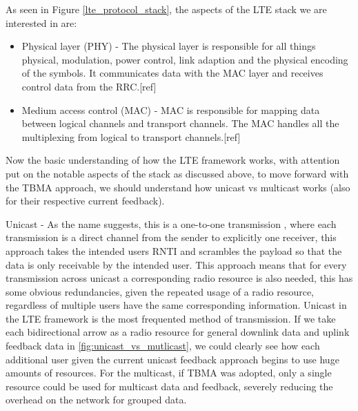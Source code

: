 \documentclass{article}
\begin{document}
As seen in Figure \ref{lte_protocol_stack}, the aspects of the LTE stack we are interested in are:
\begin{itemize}
    \item Physical layer (PHY) - The physical layer is responsible for all things physical, modulation, power control, link adaption and the physical encoding of the symbols. It communicates data with the MAC layer and receives control data from the RRC.[ref]
    \item Medium access control (MAC) - MAC is responsible for mapping data between logical channels and transport channels. The MAC handles all the multiplexing from logical to transport channels.[ref] 
\end{itemize}

Now the basic understanding of how the LTE framework works, with attention put on the notable aspects of the stack as discussed above, to move forward with the TBMA approach, we should understand how unicast vs multicast works (also for their respective current feedback). 

Unicast - As the name suggests, this is a one-to-one transmission , where each transmission is a direct channel from the sender to explicitly one receiver, this approach takes the intended users RNTI and scrambles the payload so that the data is only receivable by the intended user. This approach means that for every transmission across unicast a corresponding radio resource is also needed, this has some obvious redundancies, given the repeated usage of a radio resource, regardless of multiple users have the same corresponding information. Unicast in the LTE framework is the most frequented method of transmission. If we take each bidirectional arrow as a radio resource for general downlink data and uplink feedback data in \cref{fig:unicast_vs_mutlicast}, we could clearly see how each additional user given the current unicast feedback approach begins to use huge amounts of resources. For the multicast, if TBMA was adopted, only a single resource could be used for multicast data and feedback, severely reducing the overhead on the network for grouped data. 
\end{document}
